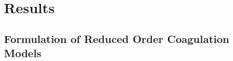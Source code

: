 \documentclass[processes,article,received,moreauthors,pdftex,12pt,a4paper]{mdpi}
\begin{document}
\section{Results}


\subsection{Formulation of Reduced Order Coagulation Models}
\end{document}
